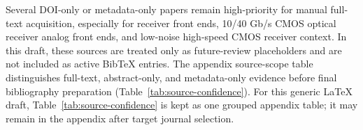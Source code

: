Several DOI-only or metadata-only papers remain high-priority for manual full-text acquisition, especially for receiver front ends, 10/40 Gb/s CMOS optical receiver analog front ends, and low-noise high-speed CMOS receiver context. In this draft, these sources are treated only as future-review placeholders and are not included as active BibTeX entries. The appendix source-scope table distinguishes full-text, abstract-only, and metadata-only evidence before final bibliography preparation (Table~\ref{tab:source-confidence}). For this generic LaTeX draft, Table~\ref{tab:source-confidence} is kept as one grouped appendix table; it may remain in the appendix after target journal selection.

